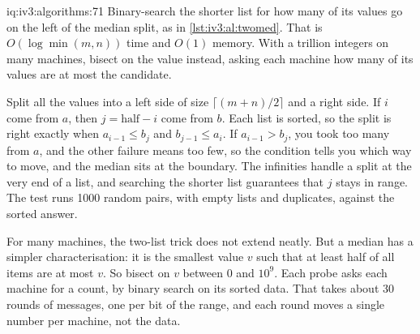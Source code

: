 \begin{solution}{iq:iv3:algorithms:71}
Binary-search the shorter list for how many of its values go on the left of the median split, as in \cref{lst:iv3:al:twomed}. That is $O(\log \min(m, n))$ time and $O(1)$ memory. With a trillion integers on many machines, bisect on the value instead, asking each machine how many of its values are at most the candidate.
\label{lst:iv3:al:twomed}

Split all the values into a left side of size $\lceil (m + n)/2 \rceil$ and a right side. If $i$ come from $a$, then $j = \text{half} - i$ come from $b$. Each list is sorted, so the split is right exactly when $a_{i-1} \le b_j$ and $b_{j-1} \le a_i$. If $a_{i-1} > b_j$, you took too many from $a$, and the other failure means too few, so the condition tells you which way to move, and the median sits at the boundary. The infinities handle a split at the very end of a list, and searching the shorter list guarantees that $j$ stays in range. The test runs 1000 random pairs, with empty lists and duplicates, against the sorted answer.

For many machines, the two-list trick does not extend neatly. But a median has a simpler characterisation: it is the smallest value $v$ such that at least half of all items are at most $v$. So bisect on $v$ between 0 and $10^9$. Each probe asks each machine for a count, by binary search on its sorted data. That takes about 30 rounds of messages, one per bit of the range, and each round moves a single number per machine, not the data.

\end{solution}

